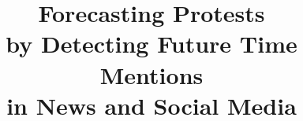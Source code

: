 \documentclass{sig-alternate}
\begin{document}
\newcommand{\narenc}[1]{[{\color{red} Naren writes: \it #1}]}
\newcommand{\sathappanc}[1]{[{\color{blue} Sathappan writes: \it #1}]}
\newcommand{\then}{\Rightarrow}
\newcommand{\softor}{\operatornamewithlimits{\tilde{\vee}}}
\newcommand{\softand}{\operatornamewithlimits{\tilde{\wedge}}}
\newcommand{\softthen}{\operatornamewithlimits{\tilde{\then}}}
\newcommand{\softneg}{\operatornamewithlimits{\tilde{\neg}}}



%

\title{Forecasting Protests \\by Detecting Future Time Mentions \\in News and Social Media}
%
%
%
%
%
\end{document}
